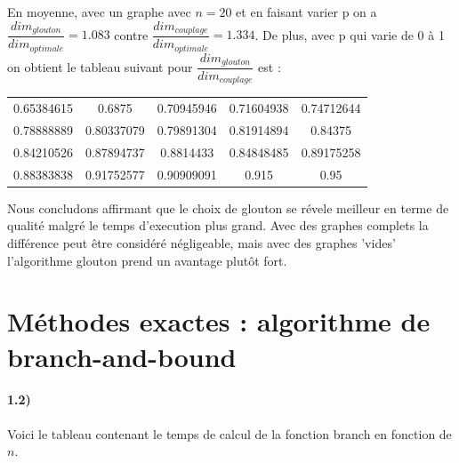 \documentclass[12pt]{article}
\begin{document}
\begin{enumerate}
                En moyenne, avec un graphe avec $n=20$ et en faisant varier p on a $\dfrac{dim_{glouton}}{dim_{optimale}} = 1.083 $ contre $\dfrac{dim_{couplage}}{dim_{optimale}} = 1.334 $.
                De plus, avec p qui varie de 0 à 1 on obtient le tableau suivant pour $\dfrac{dim_{glouton}}{dim_{couplage}}$ est :

                \begin{center}
                    \begin{tabular}{ |c c c c c| } 
                    \hline
                    0.65384615 & 0.6875 &    0.70945946  & 0.71604938 & 0.74712644  \\
                    0.78888889 & 0.80337079 & 0.79891304 & 0.81914894 & 0.84375   \\
                    0.84210526  & 0.87894737 & 0.8814433 & 0.84848485 & 0.89175258 \\
                     0.88383838 &  0.91752577 & 0.90909091 & 0.915   &    0.95\\
                    \hline
                    \end{tabular}
                    \end{center}


                Nous concludons affirmant que le choix de glouton se révele meilleur en terme de qualité malgré le temps d'execution plus grand.
                Avec des graphes complets la différence peut être considéré négligeable, mais avec des graphes 'vides' l'algorithme glouton prend un avantage plutôt fort.

        \end{enumerate}
        

\section{Méthodes exactes : algorithme de branch-and-bound}

    \paragraph{1.2)}
        Voici le tableau contenant le temps de calcul de la fonction branch en fonction de $n$.
\end{document}
